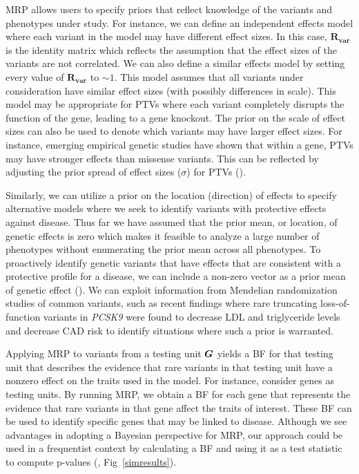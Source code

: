 MRP allows users to specify priors that reflect knowledge of the variants and phenotypes under study. For instance, we can define an independent effects model where each variant in the model may have different effect sizes. In this case, $\mathbf{R_{\textrm{var}}}$ is the identity matrix which reflects the assumption that the effect sizes of the variants are not correlated. We can also define a similar effects model by setting every value of $\mathbf{R_{\textrm{var}}}$ to $\sim 1$. This model assumes that all variants under consideration have similar effect sizes (with possibly differences in scale). This model may be appropriate for PTVs where each variant completely disrupts the function of the gene, leading to a gene knockout. The prior on the scale of effect sizes can also be used to denote which variants may have larger effect sizes. For instance, emerging empirical genetic studies have shown that within a gene, PTVs may have stronger effects than missense variants\cite{do2015exome}. This can be reflected by adjusting the prior spread of effect sizes ($\sigma$) for PTVs ().

Similarly, we can utilize a prior on the location (direction) of effects to specify alternative models where we seek to identify variants with protective effects against disease. Thus far we have assumed that the prior mean, or location, of genetic effects is zero which makes it feasible to analyze a large number of phenotypes without enumerating the prior mean across all phenotypes. To proactively identify genetic variants that have effects that are consistent with a protective profile for a disease, we can include a non-zero vector as a prior mean of genetic effect (). We can exploit information from Mendelian randomization studies of common variants, such as recent findings where rare truncating loss-of-function variants in {\it PCSK9} were found to decrease LDL and triglyceride levels and decrease CAD risk\cite{cohen2005low,pcsk9,do2013common,cohorts2014loss} to identify situations where such a prior is warranted.

Applying MRP to variants from a testing unit ${\boldsymbol G}$ yields a BF for that testing unit that describes the evidence that rare variants in that testing unit have a nonzero effect on the traits used in the model. For instance, consider genes as testing units. By running MRP, we obtain a BF for each gene that represents the evidence that rare variants in that gene affect the traits of interest. These BF can be used to identify specific genes that may be linked to disease. Although we see advantages in adopting a Bayesian perspective for MRP, our approach could be used in a frequentist context by calculating a BF and using it as a test statistic to compute p-values (, Fig~\ref{simresults}).
 
